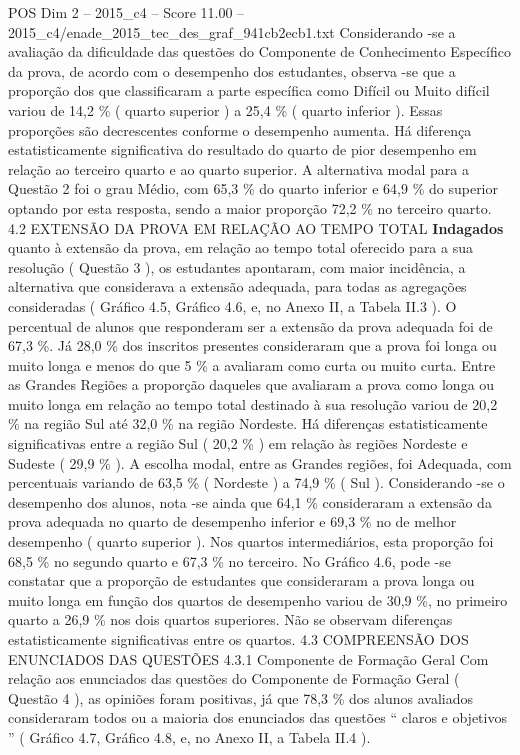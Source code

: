 \begin{textsample}{POS Dim 2 – 2015\_c4 – Score 11.00 – 2015\_c4/enade\_2015\_tec\_des\_graf\_941cb2ecb1.txt}
Considerando -se a avaliação da dificuldade das questões do Componente de Conhecimento Específico da prova, de acordo com o desempenho dos estudantes, observa -se que a proporção dos que classificaram a parte específica como Difícil ou Muito difícil variou de 14,2 \% ( quarto superior ) a 25,4 \% ( quarto inferior ).
Essas proporções são decrescentes conforme o desempenho aumenta.
Há diferença estatisticamente significativa do resultado do quarto de pior desempenho em relação ao terceiro quarto e ao quarto superior.
A alternativa modal para a Questão 2 foi o grau Médio, com 65,3 \% do quarto inferior e 64,9 \% do superior optando por esta resposta, sendo a maior proporção 72,2 \% no terceiro quarto. 4.2 EXTENSÃO DA PROVA EM RELAÇÃO AO TEMPO TOTAL \textbf{Indagados} quanto à extensão da prova, em relação ao tempo total oferecido para a sua resolução ( Questão 3 ), os estudantes apontaram, com maior incidência, a alternativa que considerava a extensão adequada, para todas as agregações consideradas ( Gráfico 4.5, Gráfico 4.6, e, no Anexo II, a Tabela II.3 ).
O percentual de alunos que responderam ser a extensão da prova adequada foi de 67,3 \%.
Já 28,0 \% dos inscritos presentes consideraram que a prova foi longa ou muito longa e menos do que 5 \% a avaliaram como curta ou muito curta.
Entre as Grandes Regiões a proporção daqueles que avaliaram a prova como longa ou muito longa em relação ao tempo total destinado à sua resolução variou de 20,2 \% na região Sul até 32,0 \% na região Nordeste.
Há diferenças estatisticamente significativas entre a região Sul ( 20,2 \% ) em relação às regiões Nordeste e Sudeste ( 29,9 \% ).
A escolha modal, entre as Grandes regiões, foi Adequada, com percentuais variando de 63,5 \% ( Nordeste ) a 74,9 \% ( Sul ).
Considerando -se o desempenho dos alunos, nota -se ainda que 64,1 \% consideraram a extensão da prova adequada no quarto de desempenho inferior e 69,3 \% no de melhor desempenho ( quarto superior ).
Nos quartos intermediários, esta proporção foi 68,5 \% no segundo quarto e 67,3 \% no terceiro.
No Gráfico 4.6, pode -se constatar que a proporção de estudantes que consideraram a prova longa ou muito longa em função dos quartos de desempenho variou de 30,9 \%, no primeiro quarto a 26,9 \% nos dois quartos superiores.
Não se observam diferenças estatisticamente significativas entre os quartos. 4.3 COMPREENSÃO DOS ENUNCIADOS DAS QUESTÕES 4.3.1 Componente de Formação Geral Com relação aos enunciados das questões do Componente de Formação Geral ( Questão 4 ), as opiniões foram positivas, já que 78,3 \% dos alunos avaliados consideraram todos ou a maioria dos enunciados das questões “ claros e objetivos ” ( Gráfico 4.7, Gráfico 4.8, e, no Anexo II, a Tabela II.4 ).

\end{textsample}
